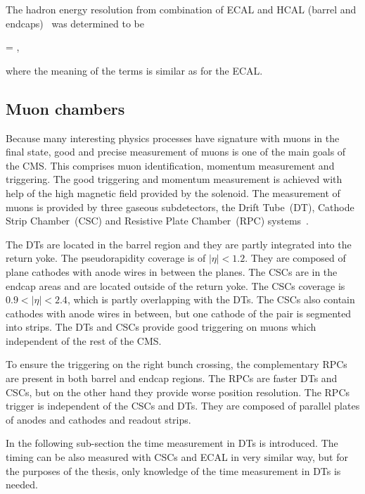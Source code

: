 The hadron energy resolution from combination of ECAL and HCAL (barrel and endcaps)~\cite{Chatrchyan:2009ag} was determined to be


{
  =   ,
}

where the meaning of the terms is similar as for the ECAL.

\subsection{Muon chambers}

Because many interesting physics processes have signature with muons in the final state, good and precise measurement of muons is one of the main goals of the CMS. This comprises muon identification, momentum measurement and triggering. The good triggering and momentum measurement is achieved with help of the high magnetic field provided by the solenoid. The measurement of muons is provided by three gaseous subdetectors, the Drift Tube~(DT), Cathode Strip Chamber~(CSC) and Resistive Plate Chamber~(RPC) systems~\cite{tdrMuon}.

The DTs are located in the barrel region and they are partly integrated into the return yoke.  The pseudorapidity coverage is of $|\eta|<1.2$. They are composed of plane cathodes with anode wires in between the planes. The CSCs are in the endcap areas and are located outside of the return yoke. The CSCs coverage is $0.9<|\eta|<2.4$, which is partly overlapping with the DTs. The CSCs also contain cathodes with anode wires in between, but one cathode of the pair is segmented into strips. The DTs and CSCs provide good triggering on muons which independent of the rest of the CMS.

To ensure the triggering on the right bunch crossing, the complementary RPCs are present in both barrel and endcap regions. The RPCs are faster DTs and CSCs, but on the other hand they provide worse position resolution. The RPCs trigger is independent of the CSCs and DTs. They are composed of parallel plates of anodes and cathodes and readout strips. 

In the following sub-section the time measurement in DTs is introduced. The timing can be also measured with CSCs and ECAL in very similar way, but for the purposes of the thesis, only knowledge of the time measurement in DTs is needed.

